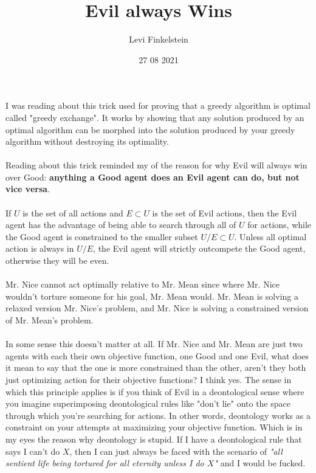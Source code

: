\usepackage{pgfplots}
\title{Evil always Wins}
\author{Levi Finkelstein}
\date{27 08 2021}

\maketitle

I was reading about this trick used for proving that a greedy algorithm is optimal called "greedy exchange". It works by showing that any solution produced by an optimal algorithm can be morphed into the solution produced by your greedy algorithm without destroying its optimality.
\\\\
Reading about this trick reminded my of the reason for why Evil will always win over Good: \textbf{anything a Good agent does an Evil agent can do, but not vice versa}.
\\\\
If $U$ is the set of all actions and $E\subset U$ is the set of Evil actions, then the Evil agent has the advantage of being able to search through all of $U$ for actions, while the Good agent is constrained to the smaller subset $U/E\subset U$. Unless all optimal action is always in $U/E$, the Evil agent will strictly outcompete the Good agent, otherwise they will be even.
\\\\
Mr. Nice cannot act optimally relative to Mr. Mean since where Mr. Nice wouldn't torture someone for his goal, Mr. Mean would. Mr. Mean is solving a relaxed version Mr. Nice's problem, and Mr. Nice is solving a constrained version of Mr. Mean's problem.
\\\\
In some sense this doesn't matter at all. If Mr. Nice and Mr. Mean are just two agents with each their own objective function, one Good and one Evil, what does it mean to say that the one is more constrained than the other, aren't they both just optimizing action for their objective functions? I think yes. The sense in which this principle applies is if you think of Evil in a deontological sense where you imagine superimposing deontological rules like "don't lie" onto the space through which you're searching for actions. In other words, deontology works as a constraint on your attempts at maximizing your objective function. Which is in my eyes the reason why deontology is stupid. If I have a deontological rule that says I can't do $X$, then I can just always be faced with the scenario of \textit{"all sentient life being tortured for all eternity unless I do $X$"} and I would be fucked.
